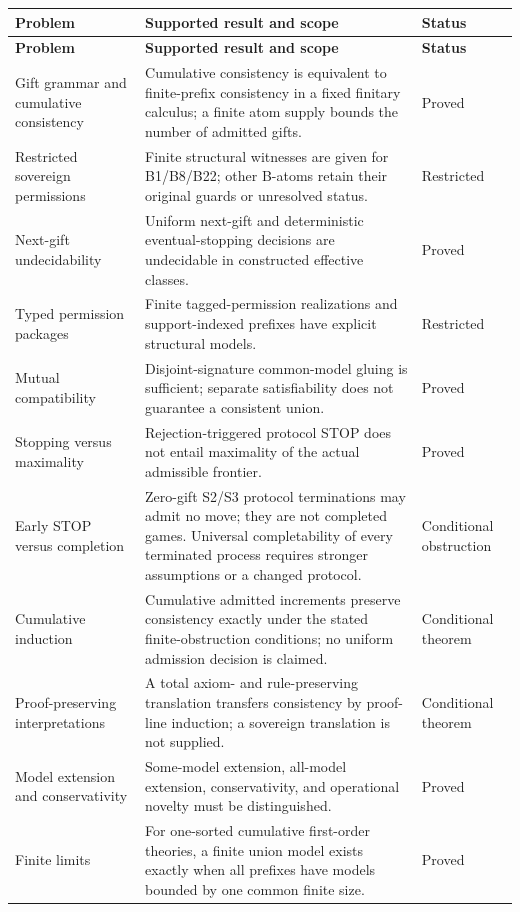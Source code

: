 \documentclass[11pt,letterpaper]{article}
\theoremstyle{definition}\newtheorem{definition}[theorem]{Definition}\newtheorem{example}[theorem]{Example}
\theoremstyle{remark}\newtheorem{remark}[theorem]{Remark}
\begin{document}
\begin{longtable}{@{}p{}p{}p{}@{}}
\toprule
\textbf{Problem} & \textbf{Supported result and scope} & \textbf{Status}\\\midrule\endfirsthead
\toprule
\textbf{Problem} & \textbf{Supported result and scope} & \textbf{Status}\\\midrule\endhead
Gift grammar and cumulative consistency & Cumulative consistency is equivalent to finite-prefix consistency in a fixed finitary calculus; a finite atom supply bounds the number of admitted gifts. & Proved \\
Restricted sovereign permissions & Finite structural witnesses are given for B1/B8/B22; other B-atoms retain their original guards or unresolved status. & Restricted \\
Next-gift undecidability & Uniform next-gift and deterministic eventual-stopping decisions are undecidable in constructed effective classes. & Proved \\
Typed permission packages & Finite tagged-permission realizations and support-indexed prefixes have explicit structural models. & Restricted \\
Mutual compatibility & Disjoint-signature common-model gluing is sufficient; separate satisfiability does not guarantee a consistent union. & Proved \\
Stopping versus maximality & Rejection-triggered protocol STOP does not entail maximality of the actual admissible frontier. & Proved \\
Early STOP versus completion & Zero-gift S2/S3 protocol terminations may admit no move; they are not completed games. Universal completability of every terminated process requires stronger assumptions or a changed protocol. & Conditional obstruction \\
Cumulative induction & Cumulative admitted increments preserve consistency exactly under the stated finite-obstruction conditions; no uniform admission decision is claimed. & Conditional theorem \\
Proof-preserving interpretations & A total axiom- and rule-preserving translation transfers consistency by proof-line induction; a sovereign translation is not supplied. & Conditional theorem \\
Model extension and conservativity & Some-model extension, all-model extension, conservativity, and operational novelty must be distinguished. & Proved \\
Finite limits & For one-sorted cumulative first-order theories, a finite union model exists exactly when all prefixes have models bounded by one common finite size. & Proved \\

\end{longtable}
\end{document}
